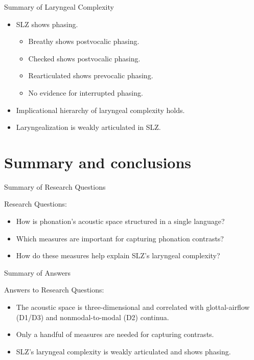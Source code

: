 \documentclass[professionalfonts]{beamer}
\begin{document}
\begin{frame}{Summary of Laryngeal Complexity}
  \begin{itemize}
    \item SLZ shows phasing.
    \begin{itemize}
      \item Breathy shows postvocalic phasing.
      \item Checked shows postvocalic phasing.
      \item Rearticulated shows prevocalic phasing.
      \item No evidence for interrupted phasing. 
    \end{itemize}
    \item Implicational hierarchy of laryngeal complexity holds.
    \item Laryngealization is weakly articulated in SLZ.
  \end{itemize}
\end{frame}

\section{Summary and conclusions}
\begin{frame}{Summary of Research Questions}
\begin{block}{Research Questions:}
    \begin{itemize}
      \item How is phonation's acoustic space structured in a single language?
      \item Which measures are important for capturing phonation contrasts?
      \item How do these measures help explain SLZ's laryngeal complexity?
    \end{itemize}
  \end{block}
\end{frame} 

\begin{frame}{Summary of Answers}
  \begin{block}{Answers to Research Questions:}
    \begin{itemize}
      \item The acoustic space is three-dimensional and correlated with glottal-airflow (D1/D3) and nonmodal-to-modal (D2) continua.
      \item Only a handful of measures are needed for capturing contrasts.
      \item SLZ's laryngeal complexity is weakly articulated and shows phasing. 
    \end{itemize} 
  \end{block}
\end{frame}
\end{document}
